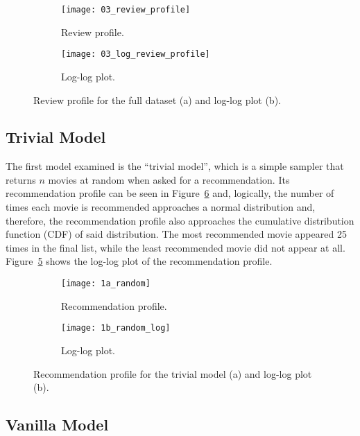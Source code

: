 \begin{figure}
  \centering
  \begin{subfigure}{0.45\textwidth}
    \centering
    \texttt{[image: 03\_review\_profile]}
    \caption{Review profile.\label{fig:fig03_review_profile}}
  \end{subfigure}
  \begin{subfigure}{0.45\textwidth}
    \centering
    \texttt{[image: 03\_log\_review\_profile]}
    \caption{Log-log plot.\label{fig:fig03_log_review_profile}}
  \end{subfigure}
  \caption{Review profile for the full dataset (a) and log-log
  plot (b).\label{fig:fig03_review_profile_both}}
\end{figure}

\subsection{Trivial Model}
\label{subsec:trivial}

The first model examined is the ``trivial model'', which is a simple sampler
that returns $n$ movies at random when asked for a recommendation. Its
recommendation profile can be seen in Figure~\ref{fig:fig1} and, logically, the
number of times each movie is recommended approaches a normal distribution and,
therefore, the recommendation profile also approaches the cumulative
distribution function (CDF) of said distribution. The most recommended movie
appeared 25 times in the final list, while the least recommended movie did not
appear at all. Figure~\ref{fig:fig1b} shows the log-log plot of the
recommendation profile.

\begin{figure}
  \centering
  \begin{subfigure}{0.45\textwidth}
    \centering
    \texttt{[image: 1a\_random]}
    \caption{Recommendation profile.\label{fig:fig1a}}
  \end{subfigure}
  \begin{subfigure}{0.45\textwidth}
    \centering
    \texttt{[image: 1b\_random\_log]}
    \caption{Log-log plot.\label{fig:fig1b}}
  \end{subfigure}
  \caption{Recommendation profile for the trivial model (a) and log-log plot
    (b).\label{fig:fig1}}
\end{figure}

\subsection{Vanilla Model}
\label{subsec:vanilla}

